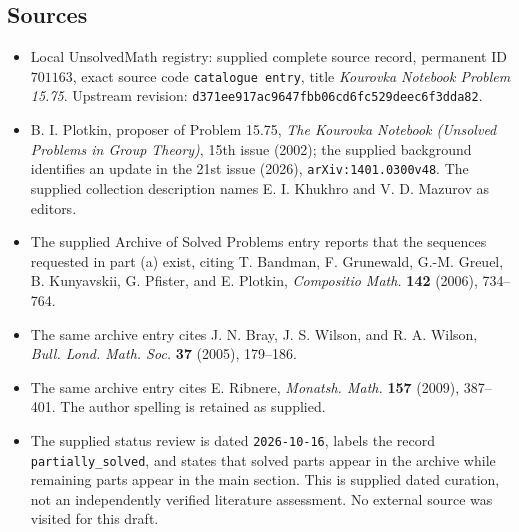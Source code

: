 \documentclass[11pt]{article}
\begin{document}
\subsection{Sources}
\begin{itemize}
\item Local UnsolvedMath registry: supplied complete source record, permanent ID \(701163\), exact source code \texttt{catalogue entry}, title \emph{Kourovka Notebook Problem 15.75}. Upstream revision: \texttt{d371ee917ac9647fbb06cd6fc529deec6f3dda82}.
\item B. I. Plotkin, proposer of Problem 15.75, \emph{The Kourovka Notebook (Unsolved Problems in Group Theory)}, 15th issue (2002); the supplied background identifies an update in the 21st issue (2026), \texttt{arXiv:1401.0300v48}. The supplied collection description names E. I. Khukhro and V. D. Mazurov as editors.
\item The supplied Archive of Solved Problems entry reports that the sequences requested in part (a) exist, citing T. Bandman, F. Grunewald, G.-M. Greuel, B. Kunyavskii, G. Pfister, and E. Plotkin, \emph{Compositio Math.} \textbf{142} (2006), 734--764.
\item The same archive entry cites J. N. Bray, J. S. Wilson, and R. A. Wilson, \emph{Bull. Lond. Math. Soc.} \textbf{37} (2005), 179--186.
\item The same archive entry cites E. Ribnere, \emph{Monatsh. Math.} \textbf{157} (2009), 387--401. The author spelling is retained as supplied.
\item The supplied status review is dated \texttt{2026-10-16}, labels the record \texttt{partially\_solved}, and states that solved parts appear in the archive while remaining parts appear in the main section. This is supplied dated curation, not an independently verified literature assessment. No external source was visited for this draft.
\end{itemize}
\end{document}
